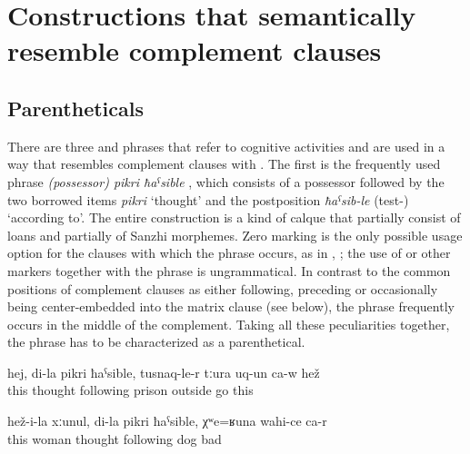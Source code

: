 \section{Constructions that semantically resemble complement clauses}
\label{Constructions that semantically resemble complement clauses}


\subsection{Parentheticals}
\label{ssec:Parentheticals}

There are three  and phrases that refer to cognitive activities and are used in a way that resembles complement clauses with . The first is the frequently used phrase \textit{(possessor) pikri ħaˁsible} , which consists of a possessor followed by the two borrowed items \textit{pikri} `thought' and the postposition \textit{ħaˁsib-le} (test-) `according to'. The entire construction is a kind of calque that partially consist of loans and partially of Sanzhi morphemes. Zero marking is the only possible usage option for the clauses with which the phrase occurs, as in , ; the use of   or other  markers together with the phrase is ungrammatical. In contrast to the common positions of complement clauses as either following, preceding or occasionally being center-embedded into the matrix clause (see  below), the phrase frequently occurs in the middle of the complement. Taking all these peculiarities together, the phrase has to be characterized as a parenthetical. 
%
\begin{exe}
	\ex	\label{ex:‎In my mind, he left prison}
	\gll	hej,	di-la	pikri	ħaˁsible,	tusnaq-le-r	tːura	uq-un	ca-w	hež\\
		this		thought following	prison	outside	go		this\\
	\glt	{}

	\ex	\label{ex:His wife is, in my mind bad like a dog@15}
	\gll	hež-i-la	xːunul,	di-la	pikri	ħaˁsible,	χʷe=ʁuna	wahi-ce	ca-r \\
		this	woman		thought	following	dog	bad	\\
	\glt	{}
\end{exe}

